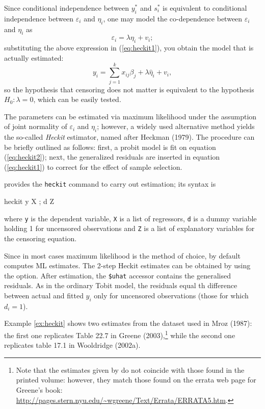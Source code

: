 Since conditional independence between $y^*_i$ and $s^*_i$ is
equivalent to conditional independence between $\varepsilon_i$ and
$\eta_i$, one may model the co-dependence between $\varepsilon_i$ and
$\eta_i$ as 
\[
  \varepsilon_i = \lambda \eta_i + v_i ;
\]
substituting the above expression in (\ref{eq:heckit1}), you obtain
the model that is actually estimated:
\[
  y_i = \sum_{j=1}^k x_{ij} \beta_j + \lambda \hat{\eta}_i + v_i ,
\]
so the hypothesis that censoring does not matter is equivalent to the
hypothesis $H_0: \lambda = 0$, which can be easily tested.

The parameters can be estimated via maximum likelihood under the
assumption of joint normality of $\varepsilon_i$ and $\eta_i$;
however, a widely used alternative method yields the so-called
\emph{Heckit} estimator, named after Heckman (1979). The procedure can
be briefly outlined as follows: first, a probit model is fit on
equation (\ref{eq:heckit2}); next, the generalized residuals are
inserted in equation (\ref{eq:heckit1}) to correct for the effect of
sample selection.

 provides the \texttt{heckit} command to carry out
estimation; its syntax is
%
\begin{code}
heckit y X ; d Z
\end{code}
%
where \texttt{y} is the dependent variable, \texttt{X} is a list of
regressors, \texttt{d} is a dummy variable holding 1 for uncensored
observations and \texttt{Z} is a list of explanatory variables for the
censoring equation.

Since in most cases maximum likelihood is the method of
choice, by default  computes ML estimates. The 2-step
Heckit estimates can be obtained by using the 
option. After estimation, the \verb|$uhat| accessor contains the
generalised residuals. As in the ordinary Tobit model, the residuals
equal th difference between actual and fitted $y_i$ only for
uncensored observations (those for which $d_i = 1$).

Example \ref{ex:heckit} shows two estimates from the dataset used in
Mroz (1987): the first one replicates Table 22.7 in Greene
(2003),\footnote{Note that the estimates given by  do not
  coincide with those found in the printed volume: however, they match
  those found on the errata web page for Greene's book:
  \url{http://pages.stern.nyu.edu/~wgreene/Text/Errata/ERRATA5.htm}.}
while the second one replicates table 17.1 in Wooldridge (2002a).

